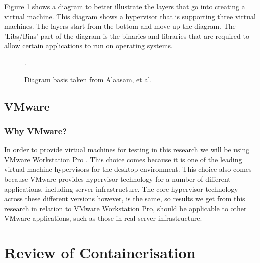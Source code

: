 Figure \ref{fig:VirtualisationDiagram} shows a diagram to better illustrate the layers that go into creating a virtual machine. This diagram shows a hypervisor that is supporting three virtual machines. The layers start from the bottom and move up the diagram. The 'Libs/Bins' part of the diagram is the binaries and libraries that are required to allow certain applications to run on operating systems.
\begin{figure}[H]
\caption{Diagram basis taken from Alaasam, et al. \citep{binsandlibs}}.
\label{fig:VirtualisationDiagram}
\centering
\end{figure}

\section{VMware}
\subsection{Why VMware?}
In order to provide virtual machines for testing in this research we will be using VMware Workstation Pro \citep{VMwareWorkstationPro}. This choice comes because it is one of the leading virtual machine hypervisors for the desktop environment\citep{BestVirtualisationSoftware}. This choice also comes because VMware provides hypervisor technology for a number of different applications, including server infrastructure. The core hypervisor technology across these different versions however, is the same\citep{VMwareProductGuide}, so results we get from this research in relation to VMware Workstation Pro, should be applicable to other VMware applications, such as those in real server infrastructure.

\chapter{Review of Containerisation}
\label{chap:containerisationReview}

